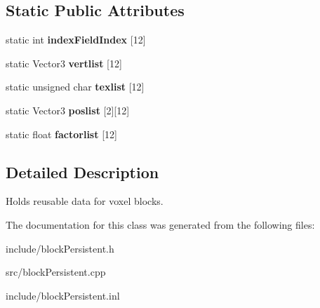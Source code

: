 \subsection*{\-Static \-Public \-Attributes}
\begin{DoxyCompactItemize}
\item 
\hypertarget{classVoxelBlockPersistent_affc347d8975d92fcb4b66dbd917ef2c5}{
static int {\bfseries index\-Field\-Index} \mbox{[}12\mbox{]}}
\label{dd/d36/classVoxelBlockPersistent_affc347d8975d92fcb4b66dbd917ef2c5}

\item 
\hypertarget{classVoxelBlockPersistent_aceb7b1b24d888960448108e552d85779}{
static \-Vector3 {\bfseries vertlist} \mbox{[}12\mbox{]}}
\label{dd/d36/classVoxelBlockPersistent_aceb7b1b24d888960448108e552d85779}

\item 
\hypertarget{classVoxelBlockPersistent_af1380a4f374927714927b77a573e1025}{
static unsigned char {\bfseries texlist} \mbox{[}12\mbox{]}}
\label{dd/d36/classVoxelBlockPersistent_af1380a4f374927714927b77a573e1025}

\item 
\hypertarget{classVoxelBlockPersistent_a05c62e006e9aad5f2a5e422f615bcf91}{
static \-Vector3 {\bfseries poslist} \mbox{[}2\mbox{]}\mbox{[}12\mbox{]}}
\label{dd/d36/classVoxelBlockPersistent_a05c62e006e9aad5f2a5e422f615bcf91}

\item 
\hypertarget{classVoxelBlockPersistent_ab1e70c277a879fa959135555c1364847}{
static float {\bfseries factorlist} \mbox{[}12\mbox{]}}
\label{dd/d36/classVoxelBlockPersistent_ab1e70c277a879fa959135555c1364847}

\end{DoxyCompactItemize}


\subsection{\-Detailed \-Description}
\-Holds reusable data for voxel blocks. 

\-The documentation for this class was generated from the following files\-:\begin{DoxyCompactItemize}
\item 
include/block\-Persistent.\-h\item 
src/block\-Persistent.\-cpp\item 
include/block\-Persistent.\-inl\end{DoxyCompactItemize}
